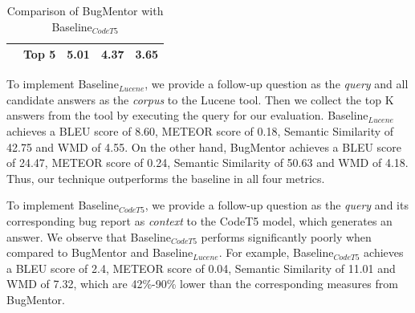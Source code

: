 \begin{table}[!ht]
{\begin{tabular}{|ccccc|}
    \multicolumn{1}{|c|}{} & \multicolumn{1}{c|}{Top 5} & \multicolumn{1}{c|}{5.01} & \multicolumn{1}{c|}{4.37} & \textbf{3.65} \\ \hline
    \end{tabular}}
\vspace{1cm} 
    \caption{Comparison of BugMentor with Baseline$_{CodeT5}$}
    \label{tab:baselinecomparison2}
\end{table}

To implement Baseline$_{Lucene}$, we provide a follow-up question as the \emph{query} and all candidate answers as the \emph{corpus} to the Lucene tool. Then we collect the top K answers from the tool by executing the query for our evaluation. Baseline$_{Lucene}$ achieves a BLEU score of 8.60, METEOR score of 0.18, Semantic Similarity of 42.75 and WMD of 4.55. On the other hand, BugMentor achieves a BLEU score of 24.47, METEOR score of 0.24, Semantic Similarity of 50.63 and WMD of 4.18. Thus, our technique outperforms the baseline in all four metrics.\par


To implement Baseline$_{CodeT5}$, we provide a follow-up question as the \emph{query} and its corresponding bug report as \emph{context} to the CodeT5 model, which generates an answer. We observe that Baseline$_{CodeT5}$ performs significantly poorly when compared to BugMentor and  Baseline$_{Lucene}$. For example, Baseline$_{CodeT5}$ achieves a BLEU score of 2.4, METEOR score of 0.04, Semantic Similarity of 11.01 and WMD of 7.32, which are 42\%-90\% lower than the corresponding measures from BugMentor.


